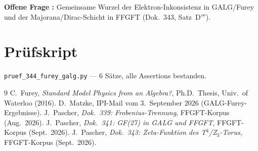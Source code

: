 \textbf{Offene Frage \SM:} Gemeinsame Wurzel der Elektron-Inkonsistenz in GALG/Furey
und der Majorana/Dirac-Schicht in FFGFT (Dok.~343, Satz~D$'''$).

\section*{Pr\"ufskript}
\texttt{pruef\_344\_furey\_galg.py} --- 6 S\"atze, alle Assertions bestanden.

\begin{thebibliography}{9}
 C.~Furey, \textit{Standard Model Physics from an Algebra?}, Ph.D.\ Thesis,
Univ.\ of Waterloo (2016).
 D.~Matzke, IPI-Mail vom 3.~September 2026 (GALG-Furey-Ergebnisse).
 J.~Pascher, \textit{Dok.~339: Frobenius-Trennung}, FFGFT-Korpus (Aug.\ 2026).
 J.~Pascher, \textit{Dok.~341: GF(27) in GALG und FFGFT}, FFGFT-Korpus (Sept.\ 2026).
 J.~Pascher, \textit{Dok.~343: Zeta-Funktion des T$^4$/Z$_3$-Torus}, FFGFT-Korpus (Sept.\ 2026).
\end{thebibliography}

